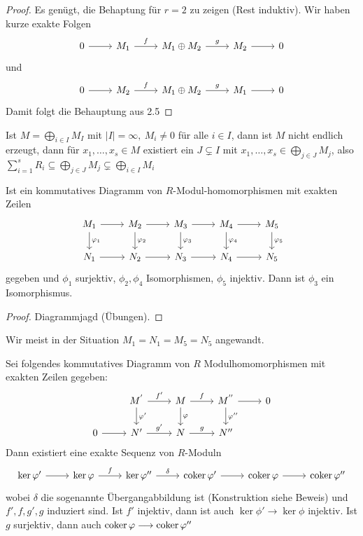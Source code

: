\begin{proof}
	Es genügt, die Behaptung für $r=2$ zu zeigen (Rest induktiv). Wir haben kurze exakte Folgen $$\begin{tikzcd}
	0  \arrow{r} & M_1 \arrow{r}{f} & M_1 \oplus M_2 \arrow{r}{g} & M_2 \arrow{r} & 0
	\end{tikzcd} $$
	 und
	$$\begin{tikzcd}
	0  \arrow{r} & M_2 \arrow{r}{f} & M_1 \oplus M_2 \arrow{r}{g} & M_1 \arrow{r} & 0
	\end{tikzcd} $$
	Damit folgt die Behauptung aus 2.5
\end{proof}
\begin{anm}
	Ist $M= \bigoplus_{i\in I} M_I$ mit $|I| = \infty, \ M_i \neq 0$ für alle $i\in I$, dann ist $M$ nicht endlich erzeugt, dann für $x_1, \ldots, x_s\in M$ existiert ein $J\subsetneq I$ mit $ x_1, \ldots, x_s \in \bigoplus_{j\in J} M_j$, also $\sum_{i=1}^s R_i \subseteq \bigoplus_{j\in J} M_j\subsetneq \bigoplus_{i\in I} M_i$
\end{anm}
\begin{bem}[Fünferlemma]\label{bem2.8} Ist ein kommutatives Diagramm von $R$-Modul-homomorphismen mit exakten Zeilen 
	$$\begin{tikzcd}
	M_1 \arrow{r} \arrow{d}{\phi_1}& M_2 \arrow{r}\arrow{d}{\phi_2}& M_3 \arrow{r} \arrow{d}{\phi_3} & M_4 \arrow{r} \arrow{d}{\phi_4} & M_5 \arrow{d}{\phi_5}\\
	N_1 \arrow{r}& N_2 \arrow{r}& N_3 \arrow{r} & N_4 \arrow{r} & N_5
	\end{tikzcd}$$
	gegeben und $\phi_1$ surjektiv, $\phi_2, \phi_4$ Isomorphismen, $\phi_5$ injektiv. Dann ist $\phi_3$ ein Isomorphismus.
\end{bem}
\begin{proof}
	Diagrammjagd (Übungen).
\end{proof}
\begin{anm}
	Wir meist in der Situation $M_1 = N_1 = M_5 = N_5$ angewandt.
\end{anm}
\begin{bem}[Schlangenlemma]\label{bem2.9}
	Sei folgendes kommutatives Diagramm von $R$ Modulhomomorphismen mit exakten Zeilen gegeben:
	$$\begin{tikzcd}
& M^{'} \arrow{r}{f'}\arrow{d}{\phi'}& M \arrow{r}{f} \arrow{d}{\phi} & M^{''} \arrow{d}{\phi''} \arrow{r}& 0\\
	0 \arrow{r}& N' \arrow{r}{g'}& N \arrow{r}{g} & N''
	\end{tikzcd}$$
	Dann existiert eine exakte Sequenz von $R$-Moduln 
	$$\begin{tikzcd}
	\ker \phi'  \arrow{r} & \ker \phi \arrow{r}{f} & \ker \phi'' \arrow{r}{\delta} & \coker \phi'  \arrow{r} &  \coker \phi \arrow{r} & \coker \phi''
	\end{tikzcd} $$
	wobei $\delta$ die sogenannte Übergangabbildung ist (Konstruktion siehe Beweis) und $f',f,g',g$ induziert sind. Ist $f'$ injektiv, dann ist auch $\ker \phi' \longrightarrow \ker \phi$ injektiv. Ist $g$ surjektiv, dann auch $\operatorname{coker} \varphi \longrightarrow \operatorname{coker} \varphi''$
	
\end{bem}
